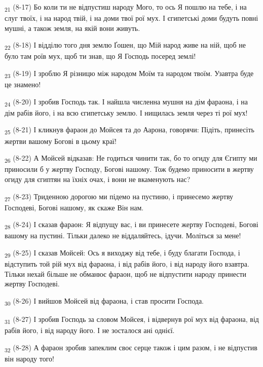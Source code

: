 \begin{tcolorbox}
\textsubscript{21} (8-17) Бо коли ти не відпустиш народу Мого, то ось Я пошлю на тебе, і на слуг твоїх, і на народ твій, і на доми твої рої мух. І єгипетські доми будуть повні мушні, а також земля, на якій вони живуть.
\end{tcolorbox}
\begin{tcolorbox}
\textsubscript{22} (8-18) І відділю того дня землю Ґошен, що Мій народ живе на ній, щоб не було там роїв мух, щоб ти знав, що Я Господь посеред землі!
\end{tcolorbox}
\begin{tcolorbox}
\textsubscript{23} (8-19) І зроблю Я різницю між народом Моїм та народом твоїм. Узавтра буде це знамено!
\end{tcolorbox}
\begin{tcolorbox}
\textsubscript{24} (8-20) І зробив Господь так. І найшла численна мушня на дім фараона, і на дім рабів його, і на всю єгипетську землю. І нищилась земля через ті рої мух!
\end{tcolorbox}
\begin{tcolorbox}
\textsubscript{25} (8-21) І кликнув фараон до Мойсея та до Аарона, говорячи: Підіть, принесіть жертви вашому Богові в цьому краї!
\end{tcolorbox}
\begin{tcolorbox}
\textsubscript{26} (8-22) А Мойсей відказав: Не годиться чинити так, бо то огиду для Єгипту ми приносили б у жертву Господу, Богові нашому. Тож будемо приносити в жертву огиду для єгиптян на їхніх очах, і вони не вкаменують нас?
\end{tcolorbox}
\begin{tcolorbox}
\textsubscript{27} (8-23) Триденною дорогою ми підемо на пустиню, і принесемо жертву Господеві, Богові нашому, як скаже Він нам.
\end{tcolorbox}
\begin{tcolorbox}
\textsubscript{28} (8-24) І сказав фараон: Я відпущу вас, і ви принесете жертву Господеві, Богові вашому на пустині. Тільки далеко не віддаляйтесь, ідучи. Моліться за мене!
\end{tcolorbox}
\begin{tcolorbox}
\textsubscript{29} (8-25) І сказав Мойсей: Ось я виходжу від тебе, і буду благати Господа, і відступить той рій мух від фараона, і від рабів його, і від народу його взавтра. Тільки нехай більше не обманює фараон, щоб не відпустити народу принести жертву Господеві.
\end{tcolorbox}
\begin{tcolorbox}
\textsubscript{30} (8-26) І вийшов Мойсей від фараона, і став просити Господа.
\end{tcolorbox}
\begin{tcolorbox}
\textsubscript{31} (8-27) І зробив Господь за словом Мойсея, і відвернув рої мух від фараона, від рабів його, і від народу його. І не зосталося ані однієї.
\end{tcolorbox}
\begin{tcolorbox}
\textsubscript{32} (8-28) А фараон зробив запеклим своє серце також і цим разом, і не відпустив він народу того!
\end{tcolorbox}
